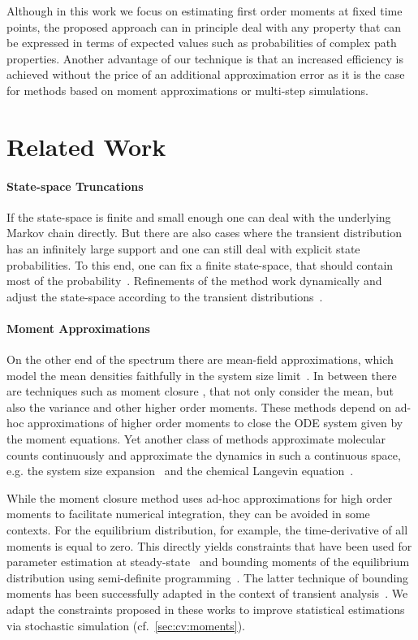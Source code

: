 Although in this work we focus on  estimating first order moments at
fixed time points, the proposed approach can in principle deal with any property that can
be expressed in terms of expected values such as probabilities
of complex path properties.
Another advantage of our technique is that an increased efficiency is achieved without the price of an additional approximation error as it is the case for methods based on moment approximations or multi-step simulations.

\section{Related Work}\label{sec:cv:related}
\paragraph{State-space Truncations}
If the state-space is finite and small enough one can deal with the underlying Markov
chain directly.
But there are also  cases where the transient distribution has an infinitely large support
and one can still deal with explicit state probabilities.
To this end, one can fix a finite state-space, that should contain most of the
probability~\cite{munsky2006finite}. Refinements of the method work
dynamically and adjust the state-space according to the transient
distributions~\cite{andreychenko2011parameter,henzinger2009sliding,mateescu2010fast}.

\paragraph{Moment Approximations}
On the other end of the spectrum there are mean-field approximations, 
which model the mean densities faithfully in the system size limit~\cite{bortolussi2013continuous}.
In between there are techniques such as moment closure \cite{singh2006lognormal}, that
not only consider the mean, but also the variance and other higher order moments.
These methods depend on ad-hoc approximations of higher order moments to
close the \ac{ODE} system given by the moment equations.
Yet another class of methods approximate molecular counts continuously and approximate the dynamics in such a continuous space, e.g. the system size expansion~\cite{van1992stochastic} and the
chemical Langevin equation~\cite{gillespie2000chemical}.

While the moment closure method uses ad-hoc approximations for high order moments to
facilitate numerical integration, they can be avoided in some contexts.
For the equilibrium distribution, for example, the time-derivative of all moments is equal to zero.
This directly yields constraints that have been used for parameter estimation at
steady-state~\cite{backenkohler2018moment}
and bounding moments of the equilibrium distribution using semi-definite
programming~\cite{ghusinga2017estimating,ghusinga2017exact,kuntz2017rigorous}.
The latter technique of bounding moments has been successfully adapted in the 
context of transient analysis~\cite{dowdy2018dynamic,sakurai2017convex,sakurai2019bounding}.
We adapt the constraints proposed in these works to improve statistical estimations via stochastic
simulation (cf.\ \autoref{sec:cv:moments}).



